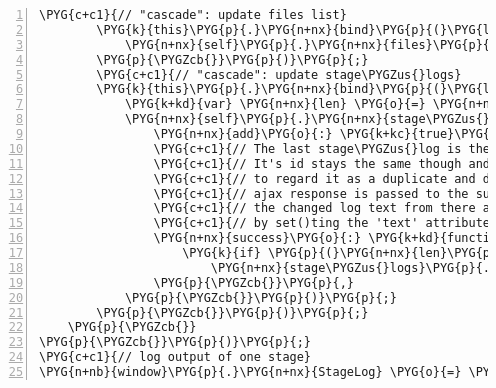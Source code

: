 \begin{Verbatim}[commandchars=\\\{\},numbers=left,firstnumber=1,stepnumber=5]
        \PYG{c+c1}{// "cascade": update files list}
        \PYG{k}{this}\PYG{p}{.}\PYG{n+nx}{bind}\PYG{p}{(}\PYG{l+s+s2}{"change:data\PYGZus{}dir\PYGZus{}state"}\PYG{p}{,} \PYG{k+kd}{function} \PYG{p}{(}\PYG{n+nx}{self}\PYG{p}{)} \PYG{p}{\PYGZob{}}
            \PYG{n+nx}{self}\PYG{p}{.}\PYG{n+nx}{files}\PYG{p}{.}\PYG{n+nx}{fetch}\PYG{p}{(}\PYG{p}{\PYGZob{}}\PYG{n+nx}{add}\PYG{o}{:} \PYG{k+kc}{true}\PYG{p}{\PYGZcb{}}\PYG{p}{)}\PYG{p}{;}
        \PYG{p}{\PYGZcb{}}\PYG{p}{)}\PYG{p}{;}
        \PYG{c+c1}{// "cascade": update stage\PYGZus{}logs}
        \PYG{k}{this}\PYG{p}{.}\PYG{n+nx}{bind}\PYG{p}{(}\PYG{l+s+s2}{"change:stage\PYGZus{}logs\PYGZus{}state"}\PYG{p}{,} \PYG{k+kd}{function} \PYG{p}{(}\PYG{n+nx}{self}\PYG{p}{)} \PYG{p}{\PYGZob{}}
            \PYG{k+kd}{var} \PYG{n+nx}{len} \PYG{o}{=} \PYG{n+nx}{self}\PYG{p}{.}\PYG{n+nx}{stage\PYGZus{}logs}\PYG{p}{.}\PYG{n+nx}{size}\PYG{p}{(}\PYG{p}{)}\PYG{p}{;}
            \PYG{n+nx}{self}\PYG{p}{.}\PYG{n+nx}{stage\PYGZus{}logs}\PYG{p}{.}\PYG{n+nx}{fetch}\PYG{p}{(}\PYG{p}{\PYGZob{}}
                \PYG{n+nx}{add}\PYG{o}{:} \PYG{k+kc}{true}\PYG{p}{,}
                \PYG{c+c1}{// The last stage\PYGZus{}log is the current one and updates frequently.}
                \PYG{c+c1}{// It's id stays the same though and which causes backbone.js}
                \PYG{c+c1}{// to regard it as a duplicate and drop it. But a copy of the}
                \PYG{c+c1}{// ajax response is passed to the success callback. So we pick}
                \PYG{c+c1}{// the changed log text from there and fire a "change" event}
                \PYG{c+c1}{// by set()ting the 'text' attribute of the affected model.}
                \PYG{n+nx}{success}\PYG{o}{:} \PYG{k+kd}{function} \PYG{p}{(}\PYG{n+nx}{stage\PYGZus{}logs}\PYG{p}{,} \PYG{n+nx}{rsp}\PYG{p}{)} \PYG{p}{\PYGZob{}}
                    \PYG{k}{if} \PYG{p}{(}\PYG{n+nx}{len}\PYG{p}{)}
                        \PYG{n+nx}{stage\PYGZus{}logs}\PYG{p}{.}\PYG{n+nx}{at}\PYG{p}{(}\PYG{n+nx}{len}\PYG{o}{-}\PYG{l+m+mi}{1}\PYG{p}{)}\PYG{p}{.}\PYG{n+nx}{set}\PYG{p}{(}\PYG{l+s+s1}{'text'}\PYG{p}{,} \PYG{n+nx}{rsp}\PYG{p}{[}\PYG{n+nx}{len}\PYG{o}{-}\PYG{l+m+mi}{1}\PYG{p}{]}\PYG{p}{.}\PYG{n+nx}{text}\PYG{p}{)}\PYG{p}{;}
                \PYG{p}{\PYGZcb{}}\PYG{p}{,}
            \PYG{p}{\PYGZcb{}}\PYG{p}{)}\PYG{p}{;}
        \PYG{p}{\PYGZcb{}}\PYG{p}{)}\PYG{p}{;}
    \PYG{p}{\PYGZcb{}}
\PYG{p}{\PYGZcb{}}\PYG{p}{)}\PYG{p}{;}
\PYG{c+c1}{// log output of one stage}
\PYG{n+nb}{window}\PYG{p}{.}\PYG{n+nx}{StageLog} \PYG{o}{=} \PYG{n+nx}{Backbone}\PYG{p}{.}\PYG{n+nx}{Model}\PYG{p}{.}\PYG{n+nx}{extend}\PYG{p}{(}\PYG{p}{\PYGZob{}}

\end{Verbatim}
